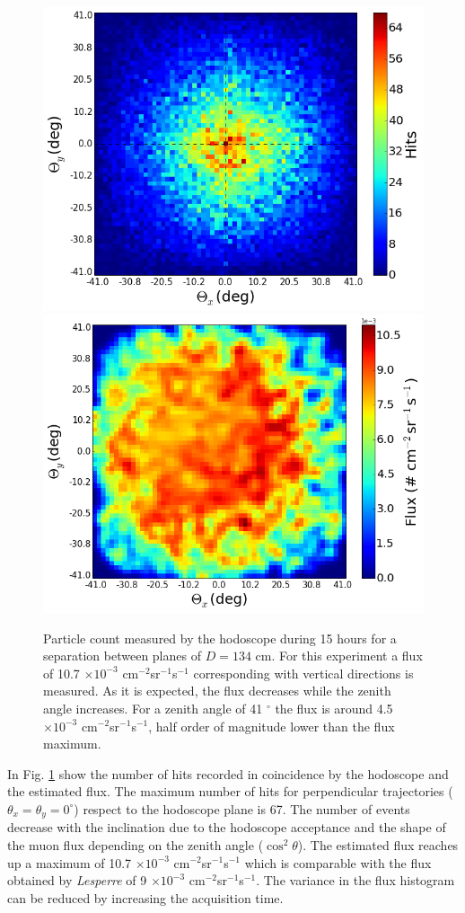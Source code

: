 \documentclass[letterpaper,11pt]{article}
\begin{document}
\begin{figure}[htb]
\centering
\includegraphics[width=0.48\columnwidth]{Figures/Hits_15h.png}
\includegraphics[width=0.49\columnwidth]{Figures/Flux.png}
\caption{Particle count measured by the hodoscope during 15 hours for a separation between planes of $D=134$ cm. For this experiment a flux of 10.7 $\times 10^{-3}$ cm$^{-2}$sr$^{-1}$s$^{-1}$ corresponding with vertical directions is measured. As it is expected, the flux decreases while the zenith angle increases. For a zenith angle of 41 $^{\circ}$ the flux is around 4.5 $\times 10^{-3}$ cm$^{-2}$sr$^{-1}$s$^{-1}$, half order of magnitude lower than the flux maximum.}
\label{fig:hits_15}
\end{figure}

In Fig. \ref{fig:hits_15} show the number of hits recorded in coincidence by the hodoscope and the estimated flux. The maximum number of hits for perpendicular trajectories ($\theta_x=\theta_y=0^{\circ}$) respect to the hodoscope plane is 67. The number of events decrease with the inclination due to the hodoscope acceptance and the shape of the muon flux depending on the zenith angle ($\cos^2 \theta$). The estimated flux reaches up a maximum of 10.7 $\times 10^{-3}$ cm$^{-2}$sr$^{-1}$s$^{-1}$ which is comparable with the flux obtained by \textit{Lesperre} \cite{Lesparre2012} of 9 $\times 10^{-3}$ cm$^{-2}$sr$^{-1}$s$^{-1}$. The variance in the flux histogram can be reduced by increasing the acquisition time.
\end{document}

